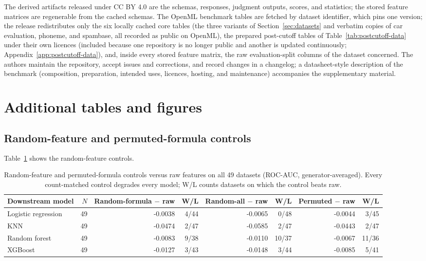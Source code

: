 The derived artifacts released under CC BY 4.0 are the schemas, responses, judgment outputs, scores, and statistics; the stored feature matrices are regenerable from the cached schemas. The OpenML benchmark tables are fetched by dataset identifier, which pins one version; the release redistributes only the six locally cached core tables (the three variants of Section~\ref{sec:datasets} and verbatim copies of car evaluation, phoneme, and spambase, all recorded as public on OpenML), the prepared post-cutoff tables of Table~\ref{tab:postcutoff-data} under their own licences (included because one repository is no longer public and another is updated continuously; Appendix~\ref{app:postcutoff-data}), and, inside every stored feature matrix, the raw evaluation-split columns of the dataset concerned. The authors maintain the repository, accept issues and corrections, and record changes in a changelog; a datasheet-style description of the benchmark (composition, preparation, intended uses, licences, hosting, and maintenance) accompanies the supplementary material.


\section{Additional tables and figures}\label{app:extra-tables}

\subsection*{Random-feature and permuted-formula controls}

Table~\ref{tab:random-controls} shows the random-feature controls.


\begin{table}[tbp]
\caption{Random-feature and permuted-formula controls versus raw features on all 49 datasets (ROC-AUC, generator-averaged). Every count-matched control degrades every model; W/L counts datasets on which the control beats raw.}\label{tab:random-controls}
\centering
\small
\begin{adjustbox}{max width=\linewidth}
\begin{tabular}{lrrrrrrr}
\toprule
Downstream model & \(N\) & Random-formula \(-\) raw & W/L & Random-all \(-\) raw & W/L & Permuted \(-\) raw & W/L \\
\midrule
Logistic regression & 49 & -0.0038 & 4/44 & -0.0065 & 0/48 & -0.0044 & 3/45 \\
KNN & 49 & -0.0474 & 2/47 & -0.0585 & 2/47 & -0.0443 & 2/47 \\
Random forest & 49 & -0.0083 & 9/38 & -0.0110 & 10/37 & -0.0067 & 11/36 \\
XGBoost & 49 & -0.0127 & 3/43 & -0.0148 & 3/44 & -0.0085 & 5/41 \\
\bottomrule
\end{tabular}
\end{adjustbox}
\end{table}

